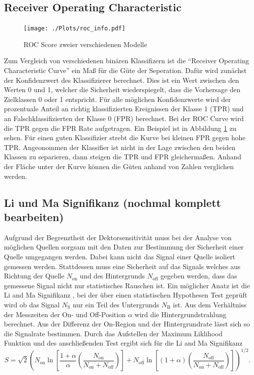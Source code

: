\subsection*{Receiver Operating Characteristic}
\begin{figure}
  \centering
  \texttt{[image: ./Plots/roc\_info.pdf]}
  \caption{ROC Score zweier verschiedenen Modelle}
  \label{fig:roc}
\end{figure}
Zum Vergleich von verschiedenen binären Klassifizern ist die ``Receiver Operating Characteristic Curve'' ein Maß für die Güte der Seperation. 
Dafür wird zunächst der Konfidenzwert des Klassifizierer berechnet. 
Dies ist ein Wert zwischen den Werten 0 und 1, welcher die Sicherheit wiederspiegelt, dass die Vorhersage den Zielklassen 0 oder 1 entspricht.
Für alle möglichen Konfidenzwerte wird der prozentuale Anteil an richtig klassifizierten Ereignissen der Klasse 1 (TPR) und an Falschklassifizierten der Klasse 0 (FPR) berechnet. 
Bei der ROC Curve wird die TPR gegen die FPR Rate aufgetragen. 
Ein Beispiel ist in Abbildung \ref{fig:roc} zu sehen.
Für einen guten Klassifizier strebt die Kurve bei kleinen FPR gegen hohe TPR. 
Angeonommen der Klassifier ist nicht in der Lage zwischen den beiden Klassen zu separieren, dann steigen die TPR und FPR gleichermaßen. 
Anhand der Fläche unter der Kurve können die Güten anhand von Zahlen verglichen werden.
\subsection*{Li und Ma Signifikanz (nochmal komplett bearbeiten)}
Aufgrund der Begrenztheit der Dektorsensitivität muss bei der Analyse von möglichen Quellen sorgsam mit den Daten zur Bestimmung der Sicherheit einer Quelle umgegangen werden.
Dabei kann nicht das Signal einer Quelle isoliert gemessen werden. 
Stattdessen muss eine Sicherheit auf das Signals welches aus Richtung der Quelle $N_\text{on}$ und des Hintergrunds $N_\text{off}$ gegeben werden, dass das gemessene Signal nicht nur statistisches Rauschen ist.
Ein möglicher Anatz ist die Li and Ma Signifikanz \cite{liandma}, bei der über einen statistischen Hypothesen Test geprüft wird ob das Signal $N_\text{S}$ nur ein Teil des Untergrunds $N_\text{B}$ ist. 
Aus dem Verhältniss der Messzeiten der On- und Off-Position $\alpha$ wird die Hintergrundstrahlung berechnet. 
Aus der Differenz der On-Region und der Hintergrundrate lässt sich so die Signalrate bestimmen. 
Durch das Aufstellen der Maximum Liklihood Funktion und des anschließenden Test ergibt sich für die Li and Ma Signifikanz
\begin{equation}
S = \sqrt{2} \left( N_\text{on} \ln \left[ \frac{1+ \alpha}{\alpha}\left( \frac{N_\text{on}}{N_\text{on} + N_\text{off}} \right) \right] + N_\text{off} \ln \left[ \left( 1+ \alpha \right) \left( \frac{N_\text{off}}{N_\text{on} + N_\text{off}} \right) \right] \right)^{1/2}.
\end{equation}

